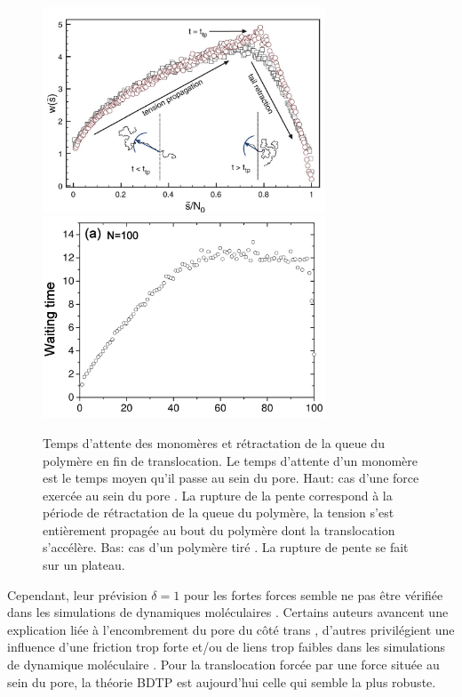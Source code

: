 \begin{figure}[H]
\begin{center}
\includegraphics[width=0.75\textwidth]{tailretractinpore.jpg}
\includegraphics[width=0.75\textwidth]{tailretractpulling.jpg} 

\caption[Temps d'attente et rétractation de la queue du polymère]{Temps d'attente des monomères et rétractation de la queue du polymère en fin de translocation. Le temps d'attente d'un monomère est le temps moyen qu'il passe au sein du pore. Haut: cas d'une force exercée au sein du pore \cite{2Ikonen2012}. La rupture de la pente correspond à la période de rétractation de la queue du polymère, la tension s'est entièrement propagée au bout du polymère dont la translocation s'accélère. Bas: cas d'un polymère tiré \cite{Huopaniemi2007}. La rupture de pente se fait sur un plateau.}
\label{tailretractation}
\end{center}
\end{figure}

Cependant, leur prévision $\delta=1$ pour les fortes forces semble ne pas être vérifiée dans les simulations de dynamiques moléculaires \cite{2Ikonen2012}. Certains auteurs avancent une explication liée à l'encombrement du pore du côté trans \cite{Palyulin2014}, d'autres privilégient une influence d'une friction trop forte et/ou de liens trop faibles dans les simulations de dynamique moléculaire \cite{2Ikonen2012}. Pour la translocation forcée par une force située au sein du pore, la théorie BDTP est aujourd'hui celle qui semble la plus robuste.\\



